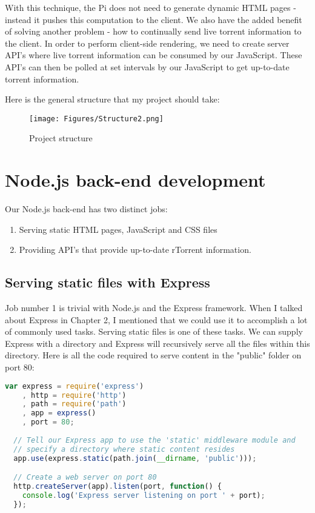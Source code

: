 With this technique, the Pi does not need to generate dynamic HTML pages - instead it pushes this computation to the client. We also have the added benefit of solving another problem - how to continually send live torrent information to the client. In order to perform client-side rendering, we need to create server API's where live torrent information can be consumed by our JavaScript. These API's can then be polled at set intervals by our JavaScript to get up-to-date torrent information.

Here is the general structure that my project should take:

\vspace{10px}
\begin{figure}[h!]
  \centering
    \texttt{[image: Figures/Structure2.png]}
  \caption{Project structure}
\end{figure}


\section{Node.js back-end development}
Our Node.js back-end has two distinct jobs:

\begin{enumerate}
	\item Serving static HTML pages, JavaScript and CSS files
	\item Providing API's that provide up-to-date rTorrent information.
\end{enumerate}

\subsection{Serving static files with Express}
Job number 1 is trivial with Node.js and the Express framework. When I talked about Express in Chapter 2, I mentioned that we could use it to accomplish a lot of commonly used tasks. Serving static files is one of these tasks. We can supply Express with a directory and Express will recursively serve all the files within this directory. Here is all the code required to serve content in the "public" folder on port 80:

\vspace{20px}
\begin{lstlisting}[caption=Express serving static files, language=JavaScript]
  var express = require('express')
    , http = require('http')
    , path = require('path')
    , app = express()
    , port = 80;
 
  // Tell our Express app to use the 'static' middleware module and
  // specify a directory where static content resides
  app.use(express.static(path.join(__dirname, 'public')));

  // Create a web server on port 80
  http.createServer(app).listen(port, function() {
    console.log('Express server listening on port ' + port);
  });
\end{lstlisting}

